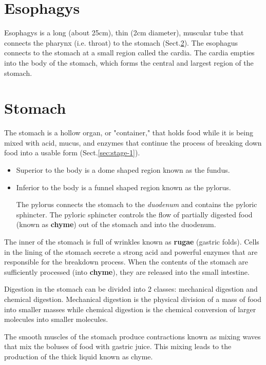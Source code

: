 \section{Esophagys}
\label{sec:esophagys}  

Esophagys is a long (about 25cm), thin (2cm diameter), muscular tube that
connects the pharynx (i.e. throat) to the stomach (Sect.\ref{sec:stomach}). The
esophagus connects to the stomach at a small region called the cardia. The
cardia empties into the body of the stomach, which forms the central and largest
region of the stomach.

\section{Stomach}
\label{sec:stomach}  

The stomach is a hollow organ, or "container," that holds food while it is being
mixed with acid, mucus, and enzymes that continue the process of breaking down
food into a usable form (Sect.\ref{sec:stage-1}).
\begin{itemize}
  \item Superior to the body is a dome shaped region known as the fundus.
  \item Inferior to the body is a funnel shaped region known as the pylorus. 
  
  The pylorus connects the stomach to the {\it duodenum} and contains the
  pyloric sphincter. The pyloric sphincter controls the flow of partially digested food
  (known as {\bf chyme}) out of the stomach and into the duodenum.
  
\end{itemize}

The inner of the stomach is full of wrinkles known as {\bf rugae} (gastric
folds). Cells in the lining of the stomach secrete a strong acid and powerful
enzymes that are responsible for the breakdown process. When the contents of the
stomach are sufficiently processed (into {\bf chyme}), they are released into
the small intestine.

Digestion in the stomach can be divided into 2 classes: mechanical digestion and
chemical digestion. Mechanical digestion is the physical division of a mass of
food into smaller masses while chemical digestion is the chemical conversion of
larger molecules into smaller molecules.   

The smooth muscles of the stomach produce contractions known as mixing waves
that mix the boluses of food with gastric juice. This mixing leads to the
production of the thick liquid known as chyme. 


